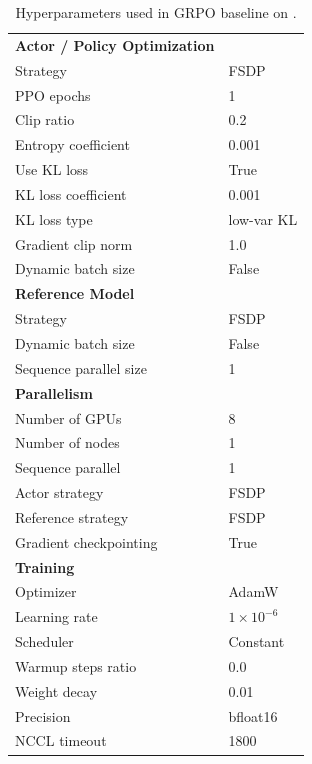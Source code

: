 \begin{table}[h!]
\begin{tabular}{p{5.5cm}p{7cm}}
\midrule
\textbf{Actor / Policy Optimization} & \\
Strategy & FSDP \\
PPO epochs & 1 \\
Clip ratio & 0.2 \\
Entropy coefficient & 0.001 \\
Use KL loss & True \\
KL loss coefficient & 0.001 \\
KL loss type & low-var KL \\
Gradient clip norm & 1.0 \\
Dynamic batch size & False \\

\midrule
\textbf{Reference Model} & \\
Strategy & FSDP \\
Dynamic batch size & False \\
Sequence parallel size & 1 \\


\midrule
\textbf{Parallelism} & \\
Number of GPUs & 8 \\
Number of nodes & 1 \\
Sequence parallel & 1 \\
Actor strategy & FSDP \\
Reference strategy & FSDP \\
Gradient checkpointing & True \\

\midrule
\textbf{Training} & \\
Optimizer & AdamW \\
Learning rate & $1 \times 10^{-6}$ \\
Scheduler & Constant \\
Warmup steps ratio & 0.0 \\
Weight decay & 0.01 \\
Precision & bfloat16 \\
NCCL timeout & 1800 \\

\bottomrule
\end{tabular}
\caption{Hyperparameters used in GRPO baseline on \qwen{}.}
\label{tab:grpo_hparams}
\end{table}